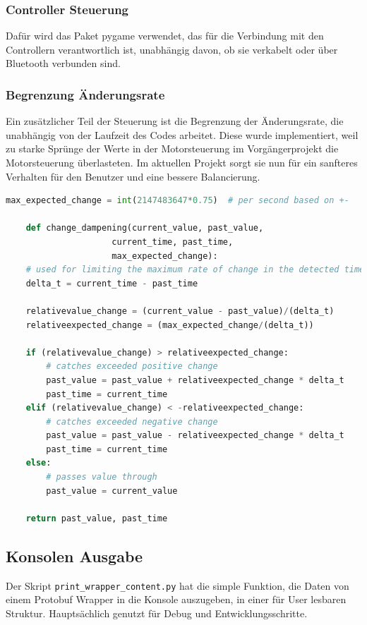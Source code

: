 \subsubsection{Controller Steuerung}
Dafür wird das Paket pygame verwendet,
das für die Verbindung mit den Controllern verantwortlich ist,
unabhängig davon, ob sie verkabelt oder über Bluetooth verbunden sind.

\subsubsection{Begrenzung Änderungsrate}
Ein zusätzlicher Teil der Steuerung ist die Begrenzung der Änderungsrate, 
die unabhängig von der Laufzeit des Codes arbeitet.
% 
Diese wurde implementiert, weil zu starke Sprünge der Werte in der Motorsteuerung 
im Vorgängerprojekt die Motorsteuerung überlasteten.
% 
Im aktuellen Projekt sorgt sie nun für ein sanfteres Verhalten für den Benutzer 
und eine bessere Balancierung.
\begin{lstlisting}[language=python, gobble=4]
    max_expected_change = int(2147483647*0.75)  # per second based on +-

    def change_dampening(current_value, past_value,
                     current_time, past_time,
                     max_expected_change):
    # used for limiting the maximum rate of change in the detected time window
    delta_t = current_time - past_time

    relativevalue_change = (current_value - past_value)/(delta_t)
    relativeexpected_change = (max_expected_change/(delta_t))

    if (relativevalue_change) > relativeexpected_change:
        # catches exceeded positive change
        past_value = past_value + relativeexpected_change * delta_t
        past_time = current_time
    elif (relativevalue_change) < -relativeexpected_change:
        # catches exceeded negative change
        past_value = past_value - relativeexpected_change * delta_t
        past_time = current_time
    else:
        # passes value through
        past_value = current_value

    return past_value, past_time
\end{lstlisting}

\subsection{Konsolen Ausgabe}
Der Skript \texttt{print\_wrapper\_content.py} hat die simple Funktion, 
die Daten von einem Protobuf Wrapper in die Konsole auszugeben, 
in einer für User lesbaren Struktur. 
Hauptsächlich genutzt für Debug und Entwicklungsschritte.

